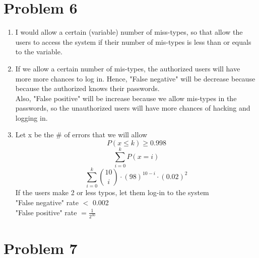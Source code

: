 \documentclass[11pt]{article}
\newenvironment{qparts}{\begin{enumerate}[{(}a{)}]}{\end{enumerate}}
\begin{document}
\newpage
\section*{Problem 6}

\begin{qparts}
\item
I would allow a certain (variable) number of miss-types, so that allow the users to access the system if their number of mis-types is less than or equals to the variable.

\item
If we allow a certain number of mis-types, the authorized users will have more more chances to log in. Hence, "False negative" will be decrease because because the authorized knows their passwords.\\
Also, "False positive" will be increase because we allow mis-types in the passwords, so the unauthorized users will have more chances of hacking and logging in.\\
\item

Let x be the \# of errors that we will allow\\
$$P(x\leq k)\geq 0.998$$
$$\sum\limits_{i=0}^k P(x=i)$$
$$\sum\limits_{i=0}^k \binom{10}{i}\cdot (98)^{10-i} \cdot (0.02)^2$$
If the users make 2 or less typos, let them log-in to the system\\
"False negative" rate $<$ 0.002\\
"False positive" rate $=\frac{1}{2^{30}}$ 


\end{qparts}

\newpage
\section*{Problem 7}
\end{document}
